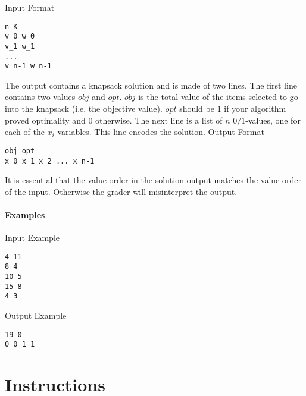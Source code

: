 \documentclass[11pt]{article}
\begin{document}
\vspace{0.2cm}
\noindent
Input Format
\vspace{-0.2cm}
\begin{Verbatim}[frame=single]
n K
v_0 w_0
v_1 w_1
...
v_n-1 w_n-1
\end{Verbatim}
%
The output contains a knapsack solution and is made of two lines.  The first line contains two values $obj$ and $opt$.  $obj$ is the total value of the items selected to go into the knapsack (i.e. the objective value).  $opt$ should be $1$ if your algorithm proved optimality and $0$ otherwise.  The next line is a list of $n$ $0/1$-values, one for each of the $x_i$ variables.  This line encodes the solution.
\clearpage
%
\vspace{0.2cm}
\noindent
Output Format
\vspace{-0.2cm}
\begin{Verbatim}[frame=single]
obj opt
x_0 x_1 x_2 ... x_n-1
\end{Verbatim}
%
It is essential that the value order in the solution output matches the value order of the input.  Otherwise the grader will misinterpret the output.

\paragraph{Examples} \mbox{}

\vspace{0.2cm}
\noindent
Input Example
\vspace{-0.2cm}
\begin{Verbatim}[frame=single]
4 11
8 4
10 5
15 8
4 3
\end{Verbatim}

\vspace{0.2cm}
\noindent
Output Example
\vspace{-0.2cm}
\begin{Verbatim}[frame=single]
19 0
0 0 1 1
\end{Verbatim}

\section{Instructions}

\end{document}
